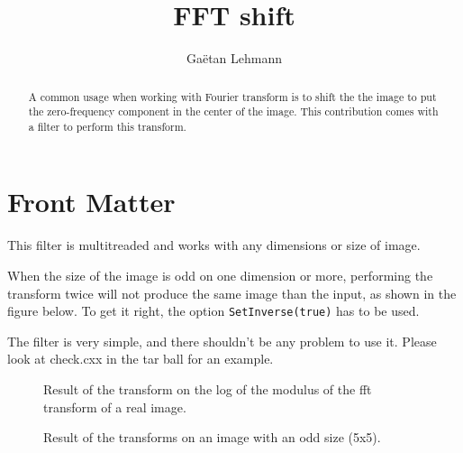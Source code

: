 \documentclass{InsightArticle}
\title{FFT shift}
\author{Ga\"etan Lehmann}
\begin{document}
\maketitle

\ifhtml
\chapter*{Front Matter\label{front}}
\fi


\begin{abstract}
\noindent

A common usage when working with Fourier transform is to shift the
the image to put the zero-frequency component in the center of the
image. This contribution comes with a filter to perform this
transform.
\end{abstract}


This filter is multitreaded and works with any dimensions or size of image.

When the size of the image is odd on one dimension or more, performing the
transform twice will not produce the same image than the input, as shown in
the figure below. To get it right, the option \verb$SetInverse(true)$ has
to be used.

The filter is very simple, and there shouldn't be any problem to use it. Please
look at check.cxx in the tar ball for an example.

\begin{figure}[htbp]
\centering
{}
\caption{Result of the transform on the log of the modulus of the fft transform of a real image.}
\end{figure}

\begin{figure}[htbp]
\centering
{}
\subfigure[the image shifted twice, with Inverse = false for the first run, and Inverse = true for the second]{\texttt{[image: 5X5]}}
\caption{Result of the transforms on an image with an odd size (5x5).}
\end{figure}

\appendix





\nocite{ITKSoftwareGuide}
\end{document}
